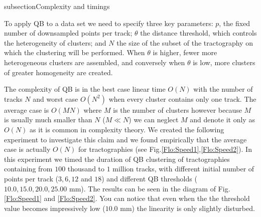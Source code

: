 \documentclass[preprint,authoryear,a4paper,10pt,onecolumn]{elsarticle}
\begin{document}
subsection{Complexity and timings\label{sub:Complexity}}

To apply QB to a data set we need to specify three key parameters:
$p$, the fixed number of downsampled points per track; $\theta$
the distance threshold, which controls the heterogeneity of clusters;
and $N$ the size of the subset of the tractography on which the clustering
will be performed. When $\theta$ is higher, fewer more heterogeneous
clusters are assembled, and conversely when $\theta$ is low, more
clusters of greater homogeneity are created.

The complexity of QB is in the best case linear time $O(N)$ with
the number of tracks $N$ and worst case $O(N^{2})$ when every cluster
contains only one track. The average case is $O(MN)$ where $M$ is
the number of clusters however because $M$ is usually much smaller
than $N$ ($M\ll N$) we can neglect $M$ and denote it only as $O(N)$
as it is common in complexity theory. We created the following experiment
to investigate this claim and we found empirically that the average
case is actually $O(N)$ for tractographies (see Fig.\ref{Flo:Speed1},\ref{Flo:Speed2}).
In this experiment we timed the duration of QB clustering of tractographies
containing from $100$ thousand to $1$ million tracks, with different
initial number of points per track ($3,6,12$ and $18$) and different
QB thresholds ($10.0,15.0,20.0,25.00$ mm). The results can be seen
in the diagram of Fig.\ref{Flo:Speed1} and \ref{Flo:Speed2}. You
can notice that even when the the threshold value becomes impressively
low ($10.0$ mm) the linearity is only slightly disturbed.
\end{document}
